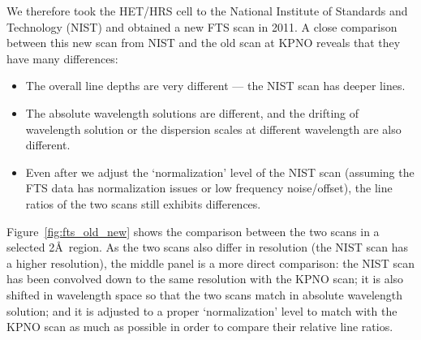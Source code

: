 We therefore took the HET/HRS cell to the National Institute of
Standards and Technology (NIST) and obtained a new FTS scan in 2011. A
close comparison between this new scan from NIST and the old scan at
KPNO reveals that they have many differences:
\begin{itemize}
  \item The overall line depths are very different --- the NIST scan
    has deeper lines.
  \item The absolute wavelength solutions are different, and the
    drifting of wavelength solution or the dispersion scales at
    different wavelength are also different.
  \item Even after we adjust the `normalization' level of the NIST
    scan (assuming the FTS data has normalization issues or low
    frequency noise/offset), the line ratios of the two scans still
    exhibits differences.
\end{itemize}

Figure~\ref{fig:fts_old_new} shows the comparison between the two
scans in a selected 2\AA\ region. As the two scans also differ in
resolution (the NIST scan has a higher resolution), the middle panel
is a more direct comparison: the NIST scan has been convolved down to
the same resolution with the KPNO scan; it is also shifted in
wavelength space so that the two scans match in absolute wavelength
solution; and it is adjusted to a proper `normalization' level to
match with the KPNO scan as much as possible in order to compare their
relative line ratios.

